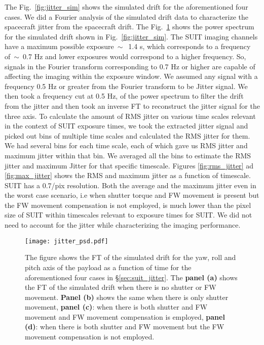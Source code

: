 The Fig.~\ref{fig:jitter_sim} shows the simulated drift for the aforementioned four cases. We did a Fourier analysis of the simulated drift data to characterize the spacecraft jitter from the spacecraft drift. The Fig.~\ref{fig:jitter_sim_ps} shows the power spectrum for the simulated drift shown in Fig.~\ref{fig:jitter_sim}. The SUIT imaging channels have a maximum possible exposure$~\sim$~1.4 s, which corresponds to a frequency of~$\sim$~0.7 Hz and lower exposures would correspond to a higher frequency. So, signals in the Fourier transform corresponding to 0.7 Hz or higher are capable of affecting the imaging within the exposure window. We assumed any signal with a frequency 0.5 Hz or greater from the Fourier transform to be Jitter signal. We then took a frequency cut at 0.5 Hz, of the power spectrum to filter the drift from the jitter and then took an inverse FT to reconstruct the jitter signal for the three axis. To calculate the amount of RMS jitter on various time scales relevant in the context of SUIT exposure times, we took the extracted jitter signal and picked out bins of multiple time scales and calculated the RMS jitter for them. We had several bins for each time scale, each of which gave us RMS jitter and maximum jitter within that bin. We averaged all the bins to estimate the RMS jitter and maximum Jitter for that specific timescale. Figures \ref{fig:rms_jitter} ad \ref{fig:max_jitter} shows the RMS and maximum jitter as a function of timescale. SUIT has a 0.7\arcsec/pix resolution. Both the average and the maximum jitter even in the worst case scenario, i.e when shutter torque and FW movement is present but the FW movement compensation is not employed, is much lower than the pixel size of SUIT within timescales relevant to exposure times for SUIT. We did not need to account for the jitter while characterizing the imaging performance.

\begin{figure}[ht!]
    \centering
    \texttt{[image: jitter\_psd.pdf]}
    \caption{The figure shows the FT of the simulated drift for the yaw, roll and pitch axis of the payload as a function of time for the aforementioned four cases in \S\ref{sec:suit_jitter}. The \textbf{panel (a)} shows the FT of the simulated drift when there is no shutter or FW movement. \textbf{Panel (b)} shows the same when there is only shutter movement, \textbf{panel (c)}: when there is both shutter and FW movement and FW movement compensation is employed, \textbf{panel (d)}: when there is both shutter and FW movement but the FW movement compensation is not employed.}
    \label{fig:jitter_sim_ps}
\end{figure}

